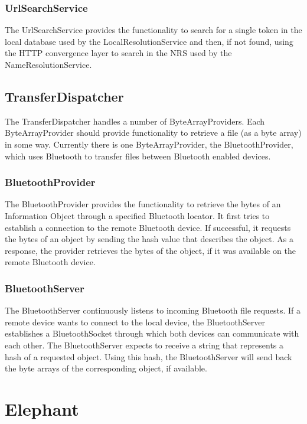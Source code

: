 \subsubsection{UrlSearchService}

The UrlSearchService provides the functionality to search for a single token in the local database 
used by the LocalResolutionService and then, if not found, using the HTTP convergence layer to search 
in the NRS used by the NameResolutionService.

\subsection{TransferDispatcher}
\label{sec:TransferDispatcher}

The TransferDispatcher handles a number of ByteArrayProviders. Each ByteArrayProvider should provide functionality to retrieve a file (as a byte array) in some way. Currently there is one ByteArrayProvider, the BluetoothProvider, which uses Bluetooth to transfer files between Bluetooth enabled devices.

\subsubsection{BluetoothProvider}
The BluetoothProvider provides the functionality to retrieve the bytes of an Information Object
through a specified Bluetooth locator. It first tries to establish a connection to the remote
Bluetooth device. If successful, it requests the bytes of an object by sending the hash value
that describes the object. As a response, the provider retrieves the bytes of the object, if
it was available on the remote Bluetooth device.

\subsubsection{BluetoothServer}
The BluetoothServer continuously listens to incoming Bluetooth file requests. 
If a remote device wants to connect to the local device, the BluetoothServer establishes
a BluetoothSocket through which both devices can communicate with each other.
The BluetoothServer expects to receive a string that represents a hash
of a requested object. Using this hash, the BluetoothServer will send back
the byte arrays of the corresponding object, if available. 

\section{Elephant}
\label{sec:Elephant}

